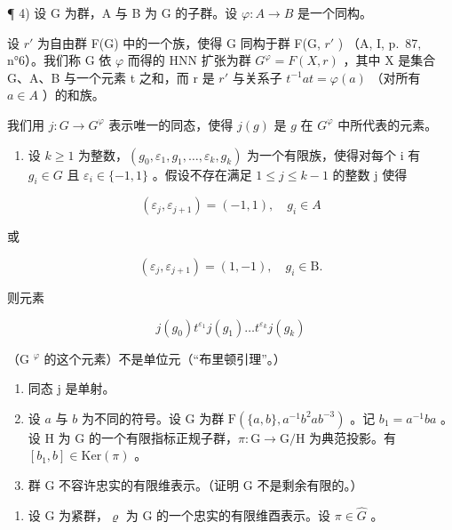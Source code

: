¶ 4) 设 G 为群，A 与 B 为 G 的子群。设 \(\varphi\colon A\to B\) 是一个同构。

设 \(r'\) 为自由群 F(G) 中的一个族，使得 G 同构于群 F(G, \(r'\) ) （A, I, p.~87, n°6）。我们称 G 依 \(\varphi\) 而得的 HNN 扩张为群 \(G^{\varphi} = F(X, r)\) ，其中 X 是集合 G、A、B 与一个元素 t 之和，而 r 是 \(r'\) 与关系子 \(t^{-1}at = \varphi(a)\) （对所有 \(a \in A\) ）的和族。

我们用 \(j\colon G\to G^{\varphi}\) 表示唯一的同态，使得 \(j(g)\) 是 \(g\) 在 \(G^{\varphi}\) 中所代表的元素。

\begin{enumerate}
\def\labelenumi{\alph{enumi})}
\tightlist
\item
  设 \(k \geqslant 1\) 为整数，\((g_{0}, \varepsilon_{1}, g_{1}, \ldots, \varepsilon_{k}, g_{k})\) 为一个有限族，使得对每个 i 有 \(g_{i} \in G\) 且 \(\varepsilon_{i} \in \{-1, 1\}\) 。假设不存在满足 \(1 \leqslant j \leqslant k - 1\) 的整数 j 使得
\end{enumerate}

\[
(\varepsilon_ {j}, \varepsilon_ {j + 1}) = (- 1, 1), \quad g _ {i} \in A
\]

或

\[
(\varepsilon_ {j}, \varepsilon_ {j + 1}) = (1, - 1), \quad g _ {i} \in \mathrm{B}.
\]

则元素

\[
j (g _ {0}) t ^ {\varepsilon_ {1}} j (g _ {1}) \dots t ^ {\varepsilon_ {k}} j (g _ {k})
\]

（G \(^{φ}\) 的这个元素）不是单位元（“布里顿引理”。）

\begin{enumerate}
\def\labelenumi{\alph{enumi})}
\setcounter{enumi}{1}
\item
  同态 j 是单射。
\item
  设 \(a\) 与 \(b\) 为不同的符号。设 G 为群 \(\mathrm{F}(\{a,b\}, a^{-1}b^{2}ab^{-3})\) 。记 \(b_{1} = a^{-1}ba\) 。设 H 为 G 的一个有限指标正规子群，\(\pi: \mathrm{G} \to \mathrm{G}/\mathrm{H}\) 为典范投影。有 \([b_{1}, b] \in \mathrm{Ker}(\pi)\) 。
\item
  群 G 不容许忠实的有限维表示。（证明 G 不是剩余有限的。）
\end{enumerate}

\begin{enumerate}
\def\labelenumi{\arabic{enumi})}
\setcounter{enumi}{4}
\tightlist
\item
  设 G 为紧群，\(\varrho\) 为 G 的一个忠实的有限维酉表示。设 \(\pi \in \widehat{G}\) 。
\end{enumerate}

